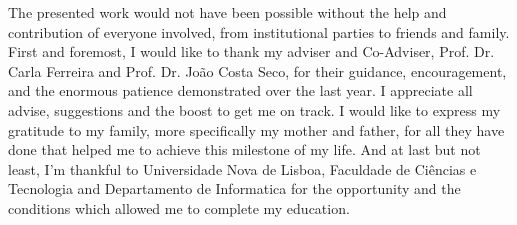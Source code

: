 
%

\begin{ntacknowledgements}

    The presented work would not have been possible without the help and contribution of everyone involved, from institutional parties to friends and family.
    First and foremost, I would like to thank my adviser and Co-Adviser, Prof. Dr. Carla Ferreira and Prof. Dr. João Costa Seco, for their guidance, encouragement, and the enormous patience demonstrated over the last year. I appreciate all advise, suggestions and the boost to get me on track.
    I would like to express my gratitude to my family, more specifically my mother and father, for all they have done that helped me to achieve this milestone of my life.
    And at last but not least, I’m thankful to Universidade Nova de Lisboa, Faculdade de Ciências e Tecnologia and Departamento de Informatica for the opportunity and the conditions which allowed me to complete my education.

\end{ntacknowledgements}